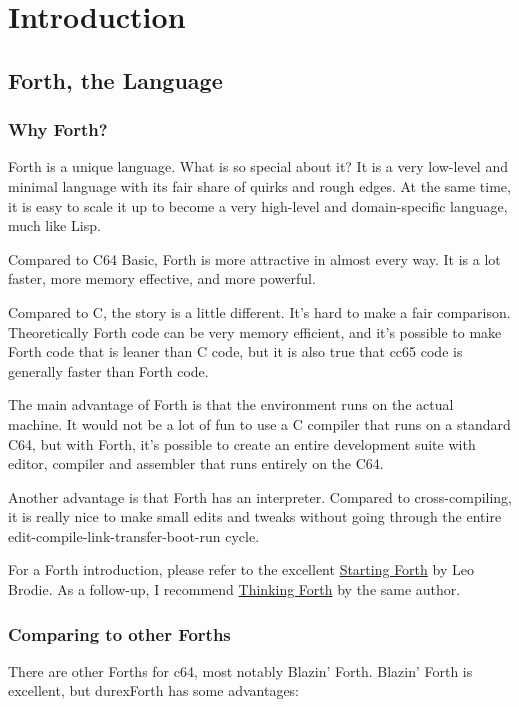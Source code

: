 \chapter{Introduction}

\section{Forth, the Language}

\subsection{Why Forth?}

Forth is a unique language. What is so special about it? It is a very low-level and minimal language with its fair share of quirks and rough edges. At the same time, it is easy to scale it up to become a very high-level and domain-specific language, much like Lisp. 

Compared to C64 Basic, Forth is more attractive in almost every way. It is a lot faster, more memory effective, and more powerful.

Compared to C, the story is a little different. It's hard to make a fair comparison. Theoretically Forth code can be very memory efficient, and it's possible to make Forth code that is leaner than C code, but it is also true that cc65 code is generally faster than Forth code.

The main advantage of Forth is that the environment runs on the actual machine. It would not be a lot of fun to use a C compiler that runs on a standard C64, but with Forth, it's possible to create an entire development suite with editor, compiler and assembler that runs entirely on the C64.

Another advantage is that Forth has an interpreter. Compared to cross-compiling, it is really nice to make small edits and tweaks without going through the entire edit-compile-link-transfer-boot-run cycle.

For a Forth introduction, please refer to the excellent
\href{http://www.forth.com/starting-forth/}{Starting Forth} by Leo Brodie. As a follow-up, I
recommend \href{http://thinking-forth.sourceforge.net/}{Thinking Forth} by the same author.

\subsection{Comparing to other Forths}

There are other Forths for c64, most notably Blazin' Forth. Blazin' Forth is excellent, but durexForth has some advantages:

